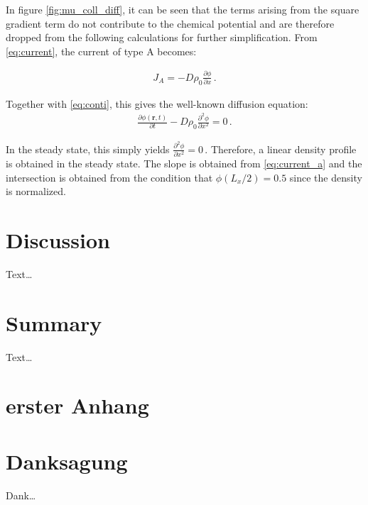 \documentclass[bachelor,       %
               twoside,        %
               BCOR10mm,       %
                ngerman,english  %
               ]{GAUBM}
\begin{document}
In figure \ref{fig:mu_coll_diff}, it can be seen that the terms arising from the square gradient term do not contribute to the chemical potential and are therefore dropped from the following calculations for further simplification. From \eqref{eq:current}, the current of type A becomes:


\begin{align}
  J_A=-D\rho_0\frac{\partial\phi}{\partial x}\,.
  \label{eq:current_a}
\end{align}



Together with \eqref{eq:conti}, this gives the well-known diffusion equation:
\begin{align}
  \frac{\partial\phi(\mathbf r, t)}{\partial t}-D\rho_0  \frac{\partial^2\phi}{\partial x^2}=0\,.
  \label{eq:diffusion}
\end{align}

In the steady state, this simply yields $\frac{\partial^2\phi}{\partial x^2}=0\,$. Therefore, a linear density profile is obtained in the steady state. The slope is obtained from \eqref{eq:current_a} and the intersection is obtained from the condition that $\phi(L_x/2)=0.5$ since the density is normalized. 
\chapter{Discussion}
Text\dots
\chapter{Summary}
Text\dots

\appendix

\chapter{erster Anhang}


\cleardoublepage
 

\chapter*{Danksagung}
Dank\dots

\Declaration
\end{document}
